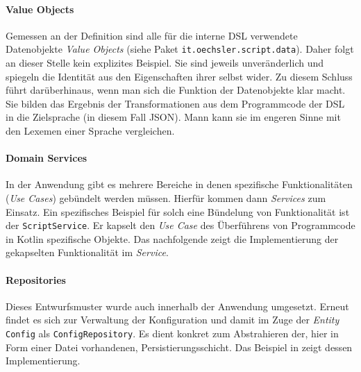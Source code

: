 \bgroup

    \label{lst:config}
\egroup

\paragraph{Value Objects} 

Gemessen an der Definition sind alle für die interne DSL verwendete Datenobjekte \emph{Value Objects} (siehe Paket \texttt{it.oechsler.script.data}).
Daher folgt an dieser Stelle kein explizites Beispiel.
Sie sind jeweils unveränderlich und spiegeln die Identität aus den Eigenschaften ihrer selbst wider.
Zu diesem Schluss führt darüberhinaus, wenn man sich die Funktion der Datenobjekte klar macht.
Sie bilden das Ergebnis der Transformationen aus dem Programmcode der DSL in die Zielsprache (in diesem Fall JSON).
Mann kann sie im engeren Sinne mit den Lexemen einer Sprache vergleichen.

\paragraph{Domain Services}

In der Anwendung gibt es mehrere Bereiche in denen spezifische Funktionalitäten (\emph{Use Cases}) gebündelt werden müssen.
Hierfür kommen dann \emph{Services} zum Einsatz.
Ein spezifisches Beispiel für solch eine Bündelung von Funktionalität ist der \texttt{ScriptService}.
Er kapselt den \emph{Use Case} des Überführens von Programmcode in Kotlin spezifische Objekte. Das nachfolgende  zeigt die Implementierung der gekapselten Funktionalität im \emph{Service}.

\bgroup

    \label{lst:script_service}
\egroup

\paragraph{Repositories}

Dieses Entwurfsmuster wurde auch innerhalb der Anwendung umgesetzt.
Erneut findet es sich zur Verwaltung der Konfiguration und damit im Zuge der \emph{Entity} \texttt{Config} als \texttt{ConfigRepository}.
Es dient konkret zum Abstrahieren der, hier in Form einer Datei vorhandenen, Persistierungsschicht.
Das Beispiel in  zeigt dessen Implementierung.

\bgroup

    \label{lst:config_repository}
\egroup

